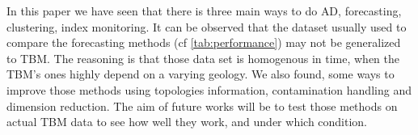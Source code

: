 \documentclass[../../main/main.tex]{subfiles}
\begin{document}
    In this paper we have seen that there is three main ways to do \ac{AD}, forecasting, clustering, index monitoring. 
    It can be observed that the dataset usually used to compare the forecasting methods (cf \ref{tab:performance}) may not be generalized to \ac{TBM}.
    The reasoning is that those data set is homogenous in time, when the \ac{TBM}'s ones highly depend on a varying geology.  
    We also found, some ways to improve those methods using topologies information, contamination handling and dimension reduction. 
    The aim of future works will be to test those methods on actual \ac{TBM} data to see how well they work, and under which condition.
\end{document}
